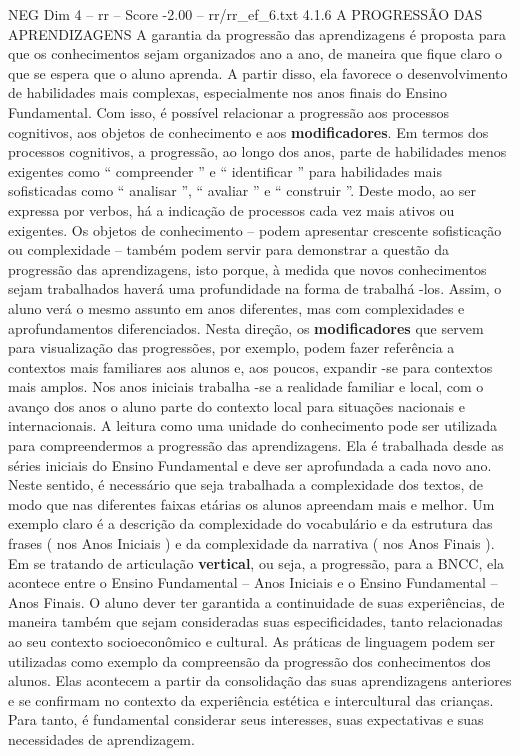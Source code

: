 \begin{textsample}{NEG Dim 4 – rr – Score -2.00 – rr/rr\_ef\_6.txt}  \label{ex:f4_neg_175}
4.1.6 A PROGRESSÃO DAS APRENDIZAGENS A garantia da progressão das aprendizagens é proposta para que os conhecimentos sejam organizados ano a ano, de maneira que fique claro o que se espera que o aluno aprenda.
A partir disso, ela favorece o desenvolvimento de habilidades mais complexas, especialmente nos anos finais do Ensino Fundamental.
Com isso, é possível relacionar a progressão aos processos cognitivos, aos objetos de conhecimento e aos \textbf{modificadores}.
Em termos dos processos cognitivos, a progressão, ao longo dos anos, parte de habilidades menos exigentes como “ compreender ” e “ identificar ” para habilidades mais sofisticadas como “ analisar ”, “ avaliar ” e “ construir ”.
Deste modo, ao ser expressa por verbos, há a indicação de processos cada vez mais ativos ou exigentes.
Os objetos de conhecimento – podem apresentar crescente sofisticação ou complexidade – também podem servir para demonstrar a questão da progressão das aprendizagens, isto porque, à medida que novos conhecimentos sejam trabalhados haverá uma profundidade na forma de trabalhá -los.
Assim, o aluno verá o mesmo assunto em anos diferentes, mas com complexidades e aprofundamentos diferenciados.
Nesta direção, os \textbf{modificadores} que servem para visualização das progressões, por exemplo, podem fazer referência a contextos mais familiares aos alunos e, aos poucos, expandir -se para contextos mais amplos.
Nos anos iniciais trabalha -se a realidade familiar e local, com o avanço dos anos o aluno parte do contexto local para situações nacionais e internacionais.
A leitura como uma unidade do conhecimento pode ser utilizada para compreendermos a progressão das aprendizagens.
Ela é trabalhada desde as séries iniciais do Ensino Fundamental e deve ser aprofundada a cada novo ano.
Neste sentido, é necessário que seja trabalhada a complexidade dos textos, de modo que nas diferentes faixas etárias os alunos apreendam mais e melhor.
Um exemplo claro é a descrição da complexidade do vocabulário e da estrutura das frases ( nos Anos Iniciais ) e da complexidade da narrativa ( nos Anos Finais ).
Em se tratando de articulação \textbf{vertical}, ou seja, a progressão, para a BNCC, ela acontece entre o Ensino Fundamental – Anos Iniciais e o Ensino Fundamental – Anos Finais.
O aluno dever ter garantida a continuidade de suas experiências, de maneira também que sejam consideradas suas especificidades, tanto relacionadas ao seu contexto socioeconômico e cultural.
As práticas de linguagem podem ser utilizadas como exemplo da compreensão da progressão dos conhecimentos dos alunos.
Elas acontecem a partir da consolidação das suas aprendizagens anteriores e se confirmam no contexto da experiência estética e intercultural das crianças.
Para tanto, é fundamental considerar seus interesses, suas expectativas e suas necessidades de aprendizagem.

\end{textsample}
